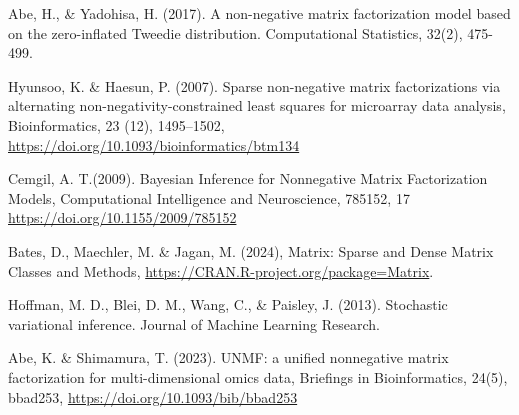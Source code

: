 \documentclass[paper=a4,10.5pt]{jsarticle} %
\numberwithin{equation}{section} %
\begin{document}
\begin{thebibliography}{9}
\item{} Abe, H., \& Yadohisa, H. (2017). A non-negative matrix factorization model based on the zero-inflated Tweedie distribution. Computational Statistics, 32(2), 475-499.
\item{}Hyunsoo, K. \&  Haesun, P. (2007). Sparse non-negative matrix factorizations via alternating non-negativity-constrained least squares for microarray data analysis, Bioinformatics,  23 (12), 1495--1502, \url{https://doi.org/10.1093/bioinformatics/btm134}
\item{} Cemgil, A. T.(2009). Bayesian Inference for Nonnegative Matrix Factorization Models, Computational Intelligence and Neuroscience, 785152, 17 \url{https://doi.org/10.1155/2009/785152}
\item{} Bates,  D., Maechler, M. \&  Jagan, M.  (2024),  Matrix: Sparse and Dense Matrix Classes and Methods,   \url{https://CRAN.R-project.org/package=Matrix}.
\item{} Hoffman, M. D., Blei, D. M., Wang, C., \& Paisley, J. (2013). Stochastic variational inference. Journal of Machine Learning Research.
\item{} Abe, K. \& Shimamura, T. (2023). UNMF: a unified nonnegative matrix factorization for multi-dimensional omics data, Briefings in Bioinformatics, 24(5), bbad253, \url{https://doi.org/10.1093/bib/bbad253}
\end{thebibliography}
\end{document}
